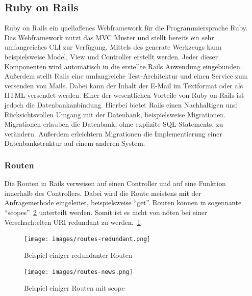 \documentclass[11pt]{article}
\begin{document}
	\subsection{Ruby on Rails}
	\label{sec: rails}
	Ruby on Rails ein quelloffenes Webframework für die Programmiersprache Ruby. Das Webframework nutzt das \gls{MVC} Muster und stellt bereits ein sehr umfangreiches \gls{CLI} zur Verfügung. Mittels des generate Werkzeugs kann beispielsweise Model, View und Controller erstellt werden. Jeder dieser Komponenten wird automatisch in die erstellte Rails Anwendung eingebunden. Außerdem stellt Rails eine umfangreiche Test-Architektur und einen Service zum versenden von Mails. Dabei kann der Inhalt der E-Mail im Textformat oder als \gls{HTML} versendet werden. Einer der wesentlichen Vorteile von Ruby on Rails ist jedoch die Datenbankanbindung. Hierbei bietet Rails einen Nachhaltigen und Rücksichtsvollen Umgang mit der Datenbank, beispielsweise Migrationen. Migrationen erlauben die Datenbank, ohne explizite SQL-Statements, zu verändern. Außerdem erleichtern Migrationen die Implementierung einer Datenbankstruktur auf einem anderen System.
	
	
	\subsubsection{Routen}
	\label{sec: routen}
	Die Routen in Rails verweisen auf einen Controller und auf eine Funktion innerhalb des Controllers. Dabei wird die Route meistens mit der Anfragemethode eingeleitet, beispielsweise \enquote{get}. Routen können in sogennante \enquote{scopes}~\ref{fig:routes-scope} unterteilt werden. Somit ist es nicht von nöten bei einer Verschachtelten \gls{URI} redundant zu werden.~\ref{fig:routes-redundant}
	
	\begin{figure}
		\texttt{[image: images/routes-redundant.png]}
		\caption{Beispiel einiger redundanter Routen }
		\label{fig:routes-redundant}
	\end{figure}
	
	\begin{figure}
		\texttt{[image: images/routes-news.png]}
		\caption{Beispiel einiger Routen mit scope }
		\label{fig:routes-scope}
	\end{figure}
	
\end{document}
